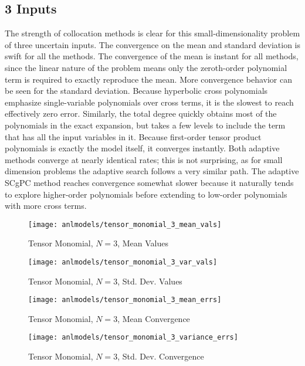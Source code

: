 \subsection{3 Inputs}
The strength of collocation methods is clear for this small-dimensionality problem of three uncertain inputs.
The convergence on the
mean and standard deviation is swift for all the methods.  The convergence of the mean is instant for all methods, since
the linear nature of the problem means only the zeroth-order polynomial term is required to exactly reproduce the mean.
More convergence behavior can be seen for the standard deviation.
Because hyperbolic cross polynomials emphasize single-variable polynomials over cross terms, it is the slowest to reach
effectively zero error.  Similarly, the total degree quickly obtains most of the polynomials in the exact expansion,
but takes a few levels to include the term that has all the input variables in it.  Because first-order tensor product
polynomials is exactly the model itself, it converges instantly.
Both adaptive methods converge at nearly identical
rates; this is not surprising, as for small dimension problems the adaptive search follows a very similar
path.  The adaptive SCgPC method reaches convergence somewhat slower because it naturally tends to explore
higher-order polynomials before extending to low-order polynomials with more cross terms.
\begin{figure}[H]
  \centering
  \texttt{[image: anlmodels/tensor\_monomial\_3\_mean\_vals]}
  \caption{Tensor Monomial, $N=3$, Mean Values}
  \label{fig:tensormono mean values 3}
\end{figure}
\begin{figure}[H]
  \centering
  \texttt{[image: anlmodels/tensor\_monomial\_3\_var\_vals]}
  \caption{Tensor Monomial, $N=3$, Std. Dev. Values}
  \label{fig:tensormono var values 3}
\end{figure}

\begin{figure}[H]
  \centering
  \texttt{[image: anlmodels/tensor\_monomial\_3\_mean\_errs]}
  \caption{Tensor Monomial, $N=3$, Mean Convergence}
  \label{fig:tensormono mean errors 3}
\end{figure}
\begin{figure}[H]
  \centering
  \texttt{[image: anlmodels/tensor\_monomial\_3\_variance\_errs]}
  \caption{Tensor Monomial, $N=3$, Std. Dev. Convergence}
  \label{fig:tensormono var errors 3}
\end{figure}




